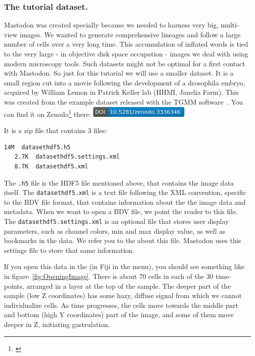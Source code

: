 \subsubsection{The tutorial dataset.}

Mastodon was created specially because we needed to harness very big, multi-view images. We wanted to generate  comprehensive lineages and follow a large number of cells over a very long time.
This accumulation of inflated words is tied to the very large  - in objective disk space  occupation - images we deal with using modern microscopy tools. 
Such datasets might not be optimal for a first contact with Mastodon.
So just for this tutorial we will use a smaller dataset.
It is a small region cut into a movie following the development of a drosophila embryo, acquired by William Lemon in Patrick Keller lab (HHMI, Janelia Farm).
This was created from the example dataset released with the TGMM software~\cite{TGMMpaper}.
You can find it on Zenodo\footnote{\href{https://zenodo.org/record/3336346}{}} there: \href{https://doi.org/10.5281/zenodo.3336346}{\includegraphics[height=1.5\fontcharht\font`\B]{figures/zenodo3336346.png}}

It is a zip file that contains 3 files:
\begin{lstlisting}[language=sh]
    14M  datasethdf5.h5
   2.7K  datasethdf5.settings.xml
   8.7K  datasethdf5.xml
\end{lstlisting}

The \texttt{.h5} file is the HDF5 file mentioned above, that contains the image data itself.
The \texttt{data\-sethdf5.xml} is a text file following the XML convention, specific to the BDV file format, that contains information about the the image data and metadata. 
When we want to open a BDV file, we point the reader to this file.
The \texttt{datasethdf5.settings.xml} is an optional file that stores user display parameters, such as channel colors, min and max display value, as well as bookmarks in the data. 
We refer you to the  about this file.
Mastodon uses this settings file to store that same information.

If you open this data in the \Bdv (in Fiji in the  menu), you should see something like in figure~\ref{fig:OpeningImage}. 
There is about 70 cells in each of the 30 time-points, arranged in a layer at the top of the sample. 
The deeper part of the sample (low Z coordinates) has some hazy, diffuse signal from which we cannot individualize cells.
As time progresses, the cells move towards the middle part and bottom (high Y coordinates) part of the image, and some of them move deeper in Z, initiating gastrulation.

